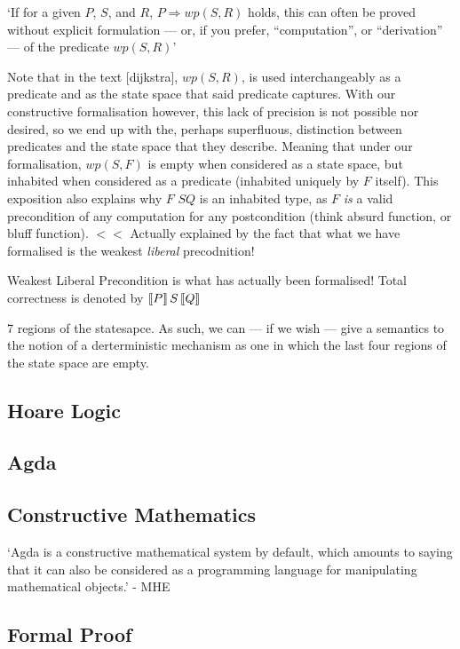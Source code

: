 \documentclass[oneside,12pt]{article}
\newcommand{\pctrip}[3]{\large{\guillemotleft}\normalsize{$#1$}\large{\guillemotright}%
  \normalsize{$#2$}\large{\guillemotleft}\normalsize{$#3$}\large{\guillemotright}\normalsize}
\newcommand{\tctrip}[3]{$\large{\llbracket}\normalsize{#1}\large{\rrbracket}\,%
  \normalsize{#2}\,\large{\llbracket}\normalsize{#3}\large{\rrbracket}\normalsize$}
\begin{document}
`If for a given $P$, $S$, and $R$, $P \Rightarrow wp(S,R)$ holds, this can often be proved without explicit formulation --- or, if you prefer, ``computation'', or ``derivation'' --- of the predicate $wp(S,R)$'




Note that in the text [dijkstra], $wp(S,R)$, is used interchangeably as a predicate and as the state space that said predicate captures. With our constructive formalisation however, this lack of precision is not possible nor desired, so we end up with the, perhaps superfluous, distinction between predicates and the state space that they describe. Meaning that under our formalisation, $wp(S,F)$ is empty when considered as a state space, but inhabited when considered as a predicate (inhabited uniquely by $F$ itself). This exposition also explains why \pctrip{F}{S}{Q} is an inhabited type, as $F$ \emph{is} a valid precondition of any computation for any postcondition (think absurd function, or bluff function). $<<$ Actually explained by the fact that what we have formalised is the weakest \emph{liberal} precodnition!


Weakest Liberal Precondition is what has actually been formalised! Total correctness is denoted by \tctrip{P}{S}{Q}


7 regions of the statesapce. As such, we can --- if we wish --- give a semantics to the notion of a derterministic mechanism as one in which the last four regions of the state space are empty.

\subsection{Hoare Logic}


\subsection{Agda}

\subsection{Constructive Mathematics}

`Agda is a constructive mathematical system by default, which amounts to saying that it can also be considered as a
programming language for manipulating mathematical objects.' - MHE


\subsection{Formal Proof}
\end{document}
